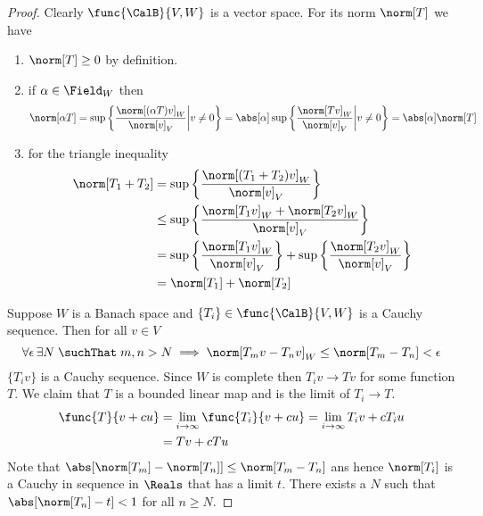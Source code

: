 \begin{proof}
    Clearly \(\func{\CalB}{V,W}\) is a vector space. For its norm \(\norm[T]\) we have
    \begin{enumerate}
        \item \(\norm[T] \geq 0\) by definition.
        \item if \(\alpha \in \Field_W\) then
              \begin{equation*}
                  \norm[\alpha T] = \sup \left\{ \dfrac{\norm[(\alpha T)v]_W}{\norm[v]_V} \middle| v \neq 0 \right\} = \abs[\alpha] \sup \left\{ \dfrac{\norm[Tv]_W}{\norm[v]_V} \middle| v \neq 0 \right\} = \abs[\alpha] \norm[T]
              \end{equation*}
        \item for the triangle inequality
              \begin{align*}
                  \norm[T_1 + T_2] & = \sup \left\{ \dfrac{\norm[(T_1 + T_2)v]_W}{\norm[v]_V} \right\}                                                     \\
                                   & \leq \sup \left\{ \dfrac{\norm[T_1v]_W + \norm[T_2v]_W}{\norm[v]_V} \right\}                                          \\
                                   & = \sup \left\{ \dfrac{\norm[T_1v]_W}{\norm[v]_V} \right\} + \sup \left\{ \dfrac{\norm[ T_2 v]_W}{\norm[v]_V} \right\} \\
                                   & = \norm[T_1] + \norm[T_2]
              \end{align*}
    \end{enumerate}
    Suppose \(W\) is a Banach space and \(\{T_i\} \in \func{\CalB}{V,W}\) is a Cauchy sequence. Then for all \(v \in V\)
    \begin{equation*}
        \forall \epsilon \, \exists N \; \suchThat \; m,n > N \implies \norm[T_m v - T_n v]_W \leq \norm[T_m - T_n] < \epsilon
    \end{equation*}
    \(\{T_i v\}\) is a Cauchy sequence. Since \(W\) is complete then \(T_i v \to Tv\) for some function \(T\). We claim that \(T\) is a bounded linear map and is the limit of \(T_i \to T\).
    \begin{align*}
        \func{T}{v + cu} & = \lim_{i \to \infty} \func{T_i}{v + cu} = \lim_{i \to \infty} T_i v + c T_i u \\
                         & = Tv + c Tu
    \end{align*}
    Note that  \( \abs[\norm[T_m] - \norm[T_n]] \leq \norm[T_m - T_n]\) ans hence \(\norm[T_i]\) is a Cauchy in sequence in \(\Reals\) that has a limit \(t\). There exists a \(N\) such that \(\abs[\norm[T_n] - t] < 1\) for all \(n \geq N\).

\end{proof}
